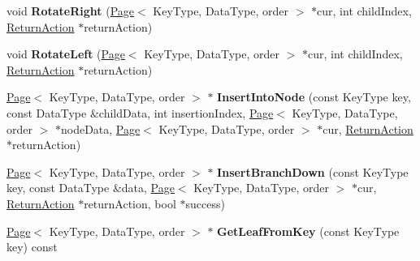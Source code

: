 \begin{DoxyCompactItemize}
\item 
\hypertarget{class_data_structures_1_1_b_plus_tree_aaa78c3ef86a10f0f403ea3145bf27dcd}{void {\bfseries Rotate\-Right} (\hyperlink{struct_data_structures_1_1_page}{Page}$<$ Key\-Type, Data\-Type, order $>$ $\ast$cur, int child\-Index, \hyperlink{struct_data_structures_1_1_b_plus_tree_1_1_return_action}{Return\-Action} $\ast$return\-Action)}\label{class_data_structures_1_1_b_plus_tree_aaa78c3ef86a10f0f403ea3145bf27dcd}

\item 
\hypertarget{class_data_structures_1_1_b_plus_tree_af6ac3613a87554754db36216ce3d27b0}{void {\bfseries Rotate\-Left} (\hyperlink{struct_data_structures_1_1_page}{Page}$<$ Key\-Type, Data\-Type, order $>$ $\ast$cur, int child\-Index, \hyperlink{struct_data_structures_1_1_b_plus_tree_1_1_return_action}{Return\-Action} $\ast$return\-Action)}\label{class_data_structures_1_1_b_plus_tree_af6ac3613a87554754db36216ce3d27b0}

\item 
\hypertarget{class_data_structures_1_1_b_plus_tree_adba3c8c7e7fb630a52ed41350dde27ea}{\hyperlink{struct_data_structures_1_1_page}{Page}$<$ Key\-Type, Data\-Type, order $>$ $\ast$ {\bfseries Insert\-Into\-Node} (const Key\-Type key, const Data\-Type \&child\-Data, int insertion\-Index, \hyperlink{struct_data_structures_1_1_page}{Page}$<$ Key\-Type, Data\-Type, order $>$ $\ast$node\-Data, \hyperlink{struct_data_structures_1_1_page}{Page}$<$ Key\-Type, Data\-Type, order $>$ $\ast$cur, \hyperlink{struct_data_structures_1_1_b_plus_tree_1_1_return_action}{Return\-Action} $\ast$return\-Action)}\label{class_data_structures_1_1_b_plus_tree_adba3c8c7e7fb630a52ed41350dde27ea}

\item 
\hypertarget{class_data_structures_1_1_b_plus_tree_ae459abd650445f328e74f11ddfa0e9fe}{\hyperlink{struct_data_structures_1_1_page}{Page}$<$ Key\-Type, Data\-Type, order $>$ $\ast$ {\bfseries Insert\-Branch\-Down} (const Key\-Type key, const Data\-Type \&data, \hyperlink{struct_data_structures_1_1_page}{Page}$<$ Key\-Type, Data\-Type, order $>$ $\ast$cur, \hyperlink{struct_data_structures_1_1_b_plus_tree_1_1_return_action}{Return\-Action} $\ast$return\-Action, bool $\ast$success)}\label{class_data_structures_1_1_b_plus_tree_ae459abd650445f328e74f11ddfa0e9fe}

\item 
\hypertarget{class_data_structures_1_1_b_plus_tree_ad061eceac63ffdc684c3b8777e36925e}{\hyperlink{struct_data_structures_1_1_page}{Page}$<$ Key\-Type, Data\-Type, order $>$ $\ast$ {\bfseries Get\-Leaf\-From\-Key} (const Key\-Type key) const }\label{class_data_structures_1_1_b_plus_tree_ad061eceac63ffdc684c3b8777e36925e}


\end{DoxyCompactItemize}
